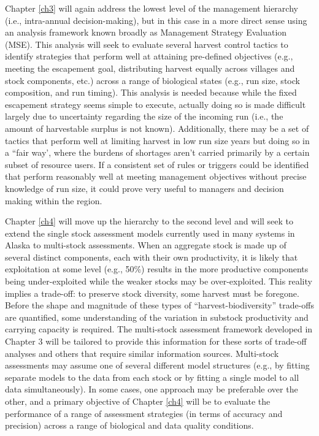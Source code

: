 \documentclass[12pt,]{book}
\theoremstyle{definition}
\theoremstyle{definition}
\theoremstyle{definition}
\theoremstyle{remark}
\begin{document}
Chapter \ref{ch3} will again address the lowest level of the management
hierarchy (i.e., intra-annual decision-making), but in this case in a
more direct sense using an analysis framework known broadly as
Management Strategy Evaluation (MSE). This analysis will seek to
evaluate several harvest control tactics to identify strategies that
perform well at attaining pre-defined objectives (e.g., meeting the
escapement goal, distributing harvest equally across villages and stock
components, etc.) across a range of biological states (e.g., run size,
stock composition, and run timing). This analysis is needed because
while the fixed escapement strategy seems simple to execute, actually
doing so is made difficult largely due to uncertainty regarding the size
of the incoming run (i.e., the amount of harvestable surplus is not
known). Additionally, there may be a set of tactics that perform well at
limiting harvest in low run size years but doing so in a ``fair way',
where the burdens of shortages aren't carried primarily by a certain
subset of resource users. If a consistent set of rules or triggers could
be identified that perform reasonably well at meeting management
objectives without precise knowledge of run size, it could prove very
useful to managers and decision making within the region.

Chapter \ref{ch4} will move up the hierarchy to the second level and
will seek to extend the single stock assessment models currently used in
many systems in Alaska to multi-stock assessments. When an aggregate
stock is made up of several distinct components, each with their own
productivity, it is likely that exploitation at some level (e.g., 50\%)
results in the more productive components being under-exploited while
the weaker stocks may be over-exploited. This reality implies a
trade-off: to preserve stock diversity, some harvest must be foregone.
Before the shape and magnitude of these types of
``harvest-biodiversity'' trade-offs are quantified, some understanding
of the variation in substock productivity and carrying capacity is
required. The multi-stock assessment framework developed in Chapter 3
will be tailored to provide this information for these sorts of
trade-off analyses and others that require similar information sources.
Multi-stock assessments may assume one of several different model
structures (e.g., by fitting separate models to the data from each stock
or by fitting a single model to all data simultaneously). In some cases,
one approach may be preferable over the other, and a primary objective
of Chapter \ref{ch4} will be to evaluate the performance of a range of
assessment strategies (in terms of accuracy and precision) across a
range of biological and data quality conditions.
\end{document}

